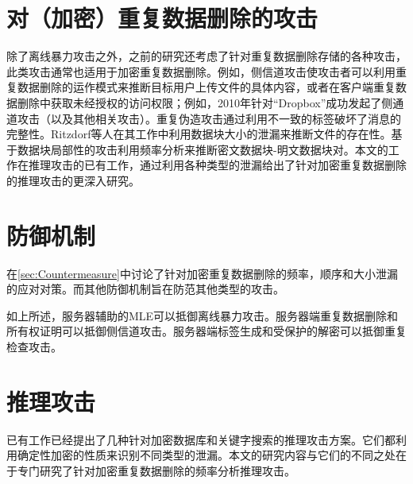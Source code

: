 \section{对（加密）重复数据删除的攻击} 

除了离线暴力攻击之外，之前的研究还考虑了针对重复数据删除存储的各种攻击，此类攻击通常也适用于加密重复数据删除。例如，侧信道攻击使攻击者可以利用重复数据删除的运作模式来推断目标用户上传文件的具体内容，或者在客户端重复数据删除中获取未经授权的访问权限；例如，2010年针对“Dropbox”成功发起了侧通道攻击（以及其他相关攻击）。重复伪造攻击通过利用不一致的标签破坏了消息的完整性。Ritzdorf等人在其工作中利用数据块大小的泄漏来推断文件的存在性。基于数据块局部性的攻击利用频率分析来推断密文数据块-明文数据块对。本文的工作在推理攻击的已有工作，通过利用各种类型的泄漏给出了针对加密重复数据删除的推理攻击的更深入研究。
   
\section{防御机制} 

 在\ref{sec:Countermeasure}中讨论了针对加密重复数据删除的频率，顺序和大小泄漏的应对对策。而其他防御机制旨在防范其他类型的攻击。
 
如上所述，服务器辅助的MLE可以抵御离线暴力攻击。服务器端重复数据删除和所有权证明可以抵御侧信道攻击。服务器端标签生成和受保护的解密可以抵御重复检查攻击。


\section{推理攻击}  

已有工作已经提出了几种针对加密数据库和关键字搜索的推理攻击方案。它们都利用确定性加密的性质来识别不同类型的泄漏。本文的研究内容与它们的不同之处在于专门研究了针对加密重复数据删除的频率分析推理攻击。
